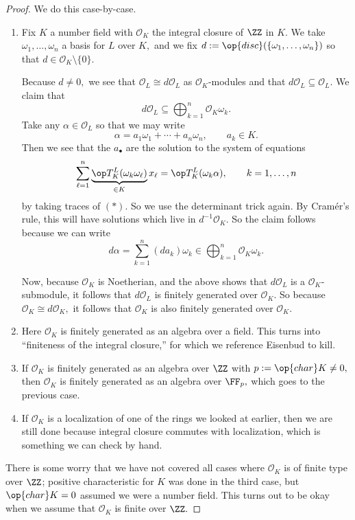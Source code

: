 \begin{proof}
    We do this case-by-case.
    \begin{enumerate}
        \item Fix $K$ a number field with $\mathcal O_K$ the integral closure of $\ZZ$ in $K.$ We take $\omega_1,\ldots,\omega_n$ a basis for $L$ over $K,$ and we fix $d:=\op{disc}(\{\omega_1,\ldots,\omega_n\})$ so that $d\in\mathcal O_K\setminus\{0\}.$
        
        Because $d\ne0,$ we see that $\mathcal O_L\cong d\mathcal O_L$ as $\mathcal O_K$-modules and that $d\mathcal O_L\subseteq\mathcal O_L.$ We claim that
        \[d\mathcal O_L\subseteq\bigoplus_{k=1}^n\mathcal O_K\omega_k.\]
        Take any $\alpha\in\mathcal O_L$ so that we may write
        \[\alpha=a_1\omega_1+\cdots+a_n\omega_n,\qquad a_k\in K.\tag{$(*)$}\]
        Then we see that the $a_\bullet$ are the solution to the system of equations
        \[\sum_{\ell=1}^n\underbrace{\op T_K^L(\omega_k\omega_\ell)}_{\in K}x_\ell=\op T_K^L(\omega_k\alpha),\qquad k=1,\ldots,n\]
        by taking traces of $(*).$ So we use the determinant trick again. By Cram\'er's rule, this will have solutions which live in $d^{-1}\mathcal O_K.$ So the claim  follows because we can write
        \[d\alpha=\sum_{k=1}^n(da_k)\omega_k\in\bigoplus_{k=1}^n\mathcal O_K\omega_k.\]
        
        Now, because $\mathcal O_K$ is Noetherian, and the above shows that $d\mathcal O_L$ is a $\mathcal O_K$-submodule, it follows that $d\mathcal O_L$ is finitely generated over $\mathcal O_K.$ So because $\mathcal O_K\cong d\mathcal O_K,$ it follows that $\mathcal O_K$ is also finitely generated over $\mathcal O_K.$
        
        \item Here $\mathcal O_K$ is finitely generated as an algebra over a field. This turns into ``finiteness of the integral closure,'' for which we reference Eisenbud to kill.
        
        \item If $\mathcal O_K$ is finitely generated as an algebra over $\ZZ$ with $p:=\op{char}K\ne0,$ then $\mathcal O_K$ is finitely generated as an algebra over $\FF_p,$ which goes to the previous case.
        
        \item If $\mathcal O_K$ is a localization of one of the rings we looked at earlier, then we are still done because integral closure commutes with localization, which is something we can check by hand.
    \end{enumerate}
    There is some worry that we have not covered all cases where $\mathcal O_K$ is of finite type over $\ZZ$; positive characteristic for $K$ was done in the third case, but $\op{char}K=0$ assumed we were a number field. This turns out to be okay when we assume that $\mathcal O_K$ is finite over $\ZZ.$
\end{proof}
